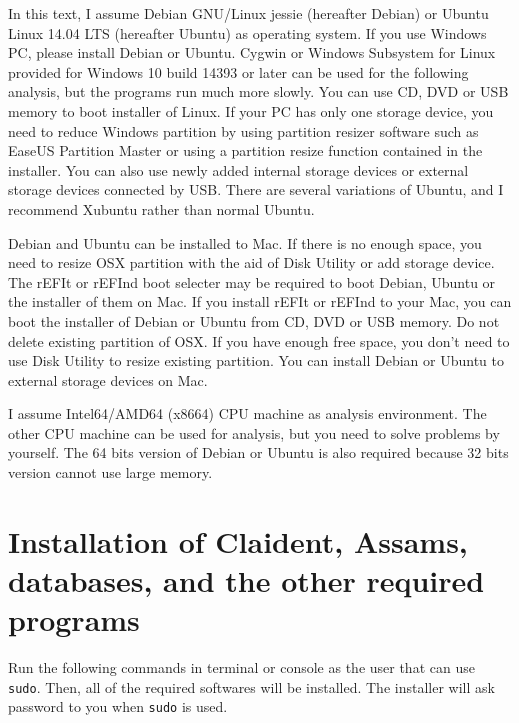 \documentclass[titlepage,10pt,a4paper,english]{jsbook}
\begin{document}
In this text, I assume Debian GNU/Linux jessie (hereafter Debian) or Ubuntu Linux 14.04 LTS (hereafter Ubuntu) as operating system.
If you use Windows PC, please install Debian or Ubuntu.
Cygwin or Windows Subsystem for Linux provided for Windows 10 build 14393 or later can be used for the following analysis, but the programs run much more slowly.
You can use CD, DVD or USB memory to boot installer of Linux.
If your PC has only one storage device, you need to reduce Windows partition by using partition resizer software such as EaseUS Partition Master or using a partition resize function contained in the installer.
You can also use newly added internal storage devices or external storage devices connected by USB.
There are several variations of Ubuntu, and I recommend Xubuntu rather than normal Ubuntu.

Debian and Ubuntu can be installed to Mac.
If there is no enough space, you need to resize OSX partition with the aid of Disk Utility or add storage device.
The rEFIt or rEFInd boot selecter may be required to boot Debian, Ubuntu or the installer of them on Mac.
If you install rEFIt or rEFInd to your Mac, you can boot the installer of Debian or Ubuntu from CD, DVD or USB memory.
Do not delete existing partition of OSX.
If you have enough free space, you don't need to use Disk Utility to resize existing partition.
You can install Debian or Ubuntu to external storage devices on Mac.

I assume Intel64/AMD64 (x86{\textunderscore}64) CPU machine as analysis environment.
The other CPU machine can be used for analysis, but you need to solve problems by yourself.
The 64 bits version of Debian or Ubuntu is also required because 32 bits version cannot use large memory.

\section{Installation of Claident, Assams, databases, and the other required programs}

Run the following commands in terminal or console as the user that can use \texttt{sudo}.
Then, all of the required softwares will be installed.
The installer will ask password to you when \texttt{sudo} is used.
\end{document}
